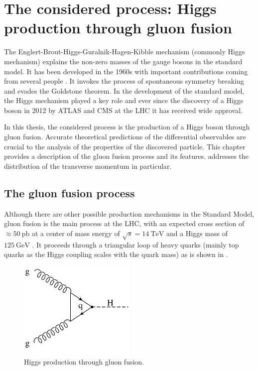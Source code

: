 
\chapter{The considered process: Higgs production through gluon fusion}
\label{ch:gfusion}
The Englert-Brout-Higgs-Guralnik-Hagen-Kibble mechanism (commonly Higgs mechanism) explains the non-zero masses of the gauge bosons in the standard model.
It has been developed in the 1960s with important contributions coming from several people \cite{higgs1964a,higgs1964b,englert1964,guralnik1964,nambu1960,anderson1963}.
It invokes the process of spontaneous symmetry breaking and evades the Goldstone theorem.
In the development of the standard model, the Higgs mechanism played a key role and ever since the discovery of a Higgs boson in 2012 by ATLAS \cite{higgsdiscovery_atlas2012} and CMS \cite{higgsdiscovery_cms2012} at the LHC it has received wide approval.

In this thesis, the considered process is the production of a Higgs boson through gluon fusion.
Accurate theoretical predictions of the differential observables are crucial to the analysis of the properties of the discovered particle.
This chapter provides a description of the gluon fusion process and its features.
 addresses the distribution of the transverse momentum in particular.
%
\section{The gluon fusion process}
Although there are other possible production mechanisms in the Standard Model, gluon fusion is the main process at the LHC, with an expected cross section of $\approx \SI{50}{\pico\barn}$ at a center of mass energy of $\sqrt{s} = \SI{14}{\tera\electronvolt}$ and a Higgs mass of $\SI{125}{\giga\electronvolt}$ \cite{higgshandbook1}.
It proceeds through a triangular loop of heavy quarks (mainly top quarks as the Higgs coupling scales with the quark mass) as is shown in .
%
\begin{figure}[]
	\includegraphics[width=0.5\textwidth]{images/gluonfusion.pdf}
	\caption{Higgs production through gluon fusion.}
	\label{fig:gluonfusion}
\end{figure}
%

